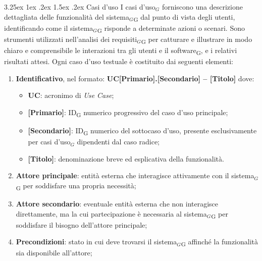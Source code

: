 \documentclass[a4paper, 10pt]{article}
\makeatletter
\renewcommand\paragraph{\@startsection{paragraph}{4}{\z@}%
  {3.25ex \@plus1ex \@minus .2ex}%
  {1.5ex \@plus .2ex}%
  {\normalfont\normalsize\bfseries}}
\makeatother
\begin{document}
\paragraph{Casi d'uso}\label{attivita-casi-uso}
I casi d'uso$_G$ forniscono una descrizione dettagliata delle funzionalità del sistema$_G$\textsubscript{G} dal punto di vista degli utenti, identificando come il sistema$_G$\textsubscript{G} risponde a determinate azioni o scenari. Sono strumenti utilizzati nell'analisi dei requisiti$_G$\textsubscript{G} per catturare e illustrare in modo chiaro e comprensibile le interazioni tra gli utenti e il software\textsubscript{G}, e i relativi risultati attesi.
Ogni caso d'uso testuale è costituito dai seguenti elementi:
\begin{enumerate}
    \item \textbf{Identificativo}, nel formato:
    \noindent\textbf{UC[Primario].[Secondario] -- [Titolo]}
    dove:
    \begin{itemize}
        \item \textbf{UC}: acronimo di \textit{Use Case};
        \item \textbf{[Primario]}: ID\textsubscript{G} numerico progressivo del caso d'uso principale;
        \item \textbf{[Secondario]}: ID\textsubscript{G} numerico del sottocaso d'uso, presente esclusivamente per casi d'uso$_G$ dipendenti dal caso radice;
        \item \textbf{[Titolo]}: denominazione breve ed esplicativa della funzionalità.
    \end{itemize}

    \item \textbf{Attore principale}: entità esterna che interagisce attivamente con il sistema$_G$\textsubscript{G} per soddisfare una propria necessità;

    \item \textbf{Attore secondario}: eventuale entità esterna che non interagisce direttamente, ma la cui partecipazione è necessaria al sistema$_G$\textsubscript{G} per soddisfare il bisogno dell'attore principale;

    \item \textbf{Precondizioni}: stato in cui deve trovarsi il sistema$_G$\textsubscript{G} affinché la funzionalità sia disponibile all'attore;


\end{enumerate}
\end{document}

